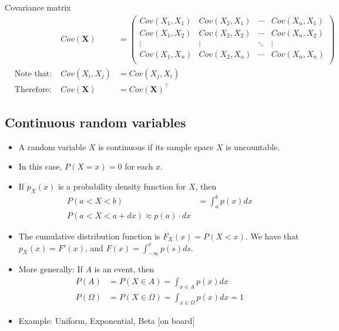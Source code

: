 \begin{bbbox}{Covariance matrix}
	\begin{align*}
		& & Cov(\mathbf{X}) &= 
		\begin{pmatrix}
   		Cov(X_1,X_1) & Cov(X_2,X_1) & \cdots & Cov(X_n,X_1) \\
   		Cov(X_1,X_2) & Cov(X_2,X_2) & \cdots & Cov(X_n,X_2) \\
   		\vdots  & \vdots  & \ddots & \vdots  \\
   		Cov(X_1,X_n) & Cov(X_2,X_n) & \cdots & Cov(X_n,X_n) \\
  		\end{pmatrix} \\
		& \text{Note that: } & Cov(X_i,X_j) &= Cov(X_j,X_i) \\
		& \text{Therefore: } & Cov(\mathbf{X}) &=  Cov(\mathbf{X})^\top
	\end{align*}
	
\end{bbbox}

\subsection{Continuous random variables}
\begin{itemize}
\item A random variable $X$ is {continuous} if its sample space $X$ is uncountable. 
\item In this case, $P(X=x)=0$ for each $x$.
\item If $p_X(x)$ is a {probability density function} for $X$, then 
\begin{align}
P(a < X <b) &=\int_a^b p(x) dx\\
P(a<X <a+dx) \approx p(a) \cdot dx
\end{align}
\item The {cumulative distribution function} is $F_X(x)=P(X<x)$. We have that $p_X(x)=F'(x)$, and $F(x)=\int_{-\infty}^x p(s) ds$.
\item
More generally: If $A$ is an event, then
\begin{align}
P(A)&=P(X \in A) =\int_{x \in A}  p(x) dx\\
P(\Omega)&=P(X \in \Omega) =\int_{x \in \Omega} p(x) dx=1
\end{align}
\item Example: Uniform, Exponential, Beta  [on board]
\end{itemize}

